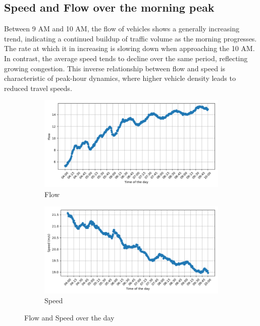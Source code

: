 	\subsection{Speed and Flow over the morning peak}
	Between 9 AM and 10 AM, the flow of vehicles shows a generally increasing trend, indicating a continued buildup of traffic volume as the morning progresses. The rate at which it in increasing is slowing down when approaching the 10 AM. In contrast, the average speed tends to decline over the same period, reflecting growing congestion.
	This inverse relationship between flow and speed is characteristic of peak-hour dynamics, where higher vehicle density leads to reduced travel speeds.
	
	\begin{figure}[H]
		\centering
		\begin{subfigure}{0.7 \linewidth}
			\includegraphics[width=\textwidth]{../Plots/Flow/avg_flow_day}
			\caption{Flow}
		\end{subfigure}
		\begin{subfigure}{0.7 \linewidth}
			\includegraphics[width=\textwidth]{../Plots/Speed/avg_speed_day}
			\caption{Speed}
		\end{subfigure}
		\caption{Flow and Speed over the day}
	\end{figure}
